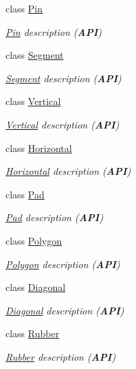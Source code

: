 \begin{DoxyCompactItemize}
class \hyperlink{classHurricane_1_1Pin}{Pin}
\begin{DoxyCompactList}\small\item\em \hyperlink{classHurricane_1_1Pin}{Pin} description ({\bfseries A\-P\-I}) \end{DoxyCompactList}\item 
class \hyperlink{classHurricane_1_1Segment}{Segment}
\begin{DoxyCompactList}\small\item\em \hyperlink{classHurricane_1_1Segment}{Segment} description ({\bfseries A\-P\-I}) \end{DoxyCompactList}\item 
class \hyperlink{classHurricane_1_1Vertical}{Vertical}
\begin{DoxyCompactList}\small\item\em \hyperlink{classHurricane_1_1Vertical}{Vertical} description ({\bfseries A\-P\-I}) \end{DoxyCompactList}\item 
class \hyperlink{classHurricane_1_1Horizontal}{Horizontal}
\begin{DoxyCompactList}\small\item\em \hyperlink{classHurricane_1_1Horizontal}{Horizontal} description ({\bfseries A\-P\-I}) \end{DoxyCompactList}\item 
class \hyperlink{classHurricane_1_1Pad}{Pad}
\begin{DoxyCompactList}\small\item\em \hyperlink{classHurricane_1_1Pad}{Pad} description ({\bfseries A\-P\-I}) \end{DoxyCompactList}\item 
class \hyperlink{classHurricane_1_1Polygon}{Polygon}
\begin{DoxyCompactList}\small\item\em \hyperlink{classHurricane_1_1Polygon}{Polygon} description ({\bfseries A\-P\-I}) \end{DoxyCompactList}\item 
class \hyperlink{classHurricane_1_1Diagonal}{Diagonal}
\begin{DoxyCompactList}\small\item\em \hyperlink{classHurricane_1_1Diagonal}{Diagonal} description ({\bfseries A\-P\-I}) \end{DoxyCompactList}\item 
class \hyperlink{classHurricane_1_1Rubber}{Rubber}
\begin{DoxyCompactList}\small\item\em \hyperlink{classHurricane_1_1Rubber}{Rubber} description ({\bfseries A\-P\-I}) \end{DoxyCompactList}\item 

\end{DoxyCompactItemize}
